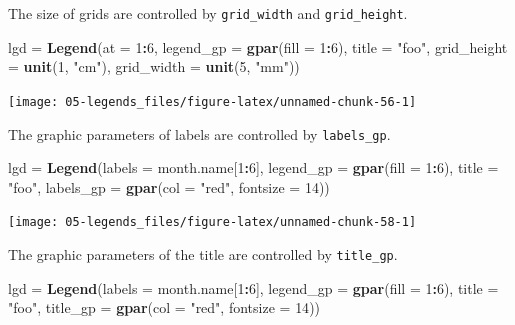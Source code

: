 \documentclass[]{book}
\newenvironment{Shaded}{\begin{snugshade}}{\end{snugshade}}
\newcommand{\KeywordTok}[1]{\textcolor[rgb]{0.13,0.29,0.53}{\textbf{#1}}}
\newcommand{\DataTypeTok}[1]{\textcolor[rgb]{0.13,0.29,0.53}{#1}}
\newcommand{\DecValTok}[1]{\textcolor[rgb]{0.00,0.00,0.81}{#1}}
\newcommand{\StringTok}[1]{\textcolor[rgb]{0.31,0.60,0.02}{#1}}
\newcommand{\OperatorTok}[1]{\textcolor[rgb]{0.81,0.36,0.00}{\textbf{#1}}}
\newcommand{\NormalTok}[1]{#1}
\theoremstyle{definition}
\theoremstyle{definition}
\theoremstyle{definition}
\theoremstyle{remark}
\begin{document}
The size of grids are controlled by \texttt{grid\_width} and
\texttt{grid\_height}.

\begin{Shaded}
\begin{Highlighting}[]
\NormalTok{lgd =}\StringTok{ }\KeywordTok{Legend}\NormalTok{(}\DataTypeTok{at =} \DecValTok{1}\OperatorTok{:}\DecValTok{6}\NormalTok{, }\DataTypeTok{legend_gp =} \KeywordTok{gpar}\NormalTok{(}\DataTypeTok{fill =} \DecValTok{1}\OperatorTok{:}\DecValTok{6}\NormalTok{), }\DataTypeTok{title =} \StringTok{"foo"}\NormalTok{, }
    \DataTypeTok{grid_height =} \KeywordTok{unit}\NormalTok{(}\DecValTok{1}\NormalTok{, }\StringTok{"cm"}\NormalTok{), }\DataTypeTok{grid_width =} \KeywordTok{unit}\NormalTok{(}\DecValTok{5}\NormalTok{, }\StringTok{"mm"}\NormalTok{))}
\end{Highlighting}
\end{Shaded}

\begin{center}\texttt{[image: 05-legends\_files/figure-latex/unnamed-chunk-56-1]} \end{center}

The graphic parameters of labels are controlled by \texttt{labels\_gp}.

\begin{Shaded}
\begin{Highlighting}[]
\NormalTok{lgd =}\StringTok{ }\KeywordTok{Legend}\NormalTok{(}\DataTypeTok{labels =}\NormalTok{ month.name[}\DecValTok{1}\OperatorTok{:}\DecValTok{6}\NormalTok{], }\DataTypeTok{legend_gp =} \KeywordTok{gpar}\NormalTok{(}\DataTypeTok{fill =} \DecValTok{1}\OperatorTok{:}\DecValTok{6}\NormalTok{), }\DataTypeTok{title =} \StringTok{"foo"}\NormalTok{, }
    \DataTypeTok{labels_gp =} \KeywordTok{gpar}\NormalTok{(}\DataTypeTok{col =} \StringTok{"red"}\NormalTok{, }\DataTypeTok{fontsize =} \DecValTok{14}\NormalTok{))}
\end{Highlighting}
\end{Shaded}

\begin{center}\texttt{[image: 05-legends\_files/figure-latex/unnamed-chunk-58-1]} \end{center}

The graphic parameters of the title are controlled by
\texttt{title\_gp}.

\begin{Shaded}
\begin{Highlighting}[]
\NormalTok{lgd =}\StringTok{ }\KeywordTok{Legend}\NormalTok{(}\DataTypeTok{labels =}\NormalTok{ month.name[}\DecValTok{1}\OperatorTok{:}\DecValTok{6}\NormalTok{], }\DataTypeTok{legend_gp =} \KeywordTok{gpar}\NormalTok{(}\DataTypeTok{fill =} \DecValTok{1}\OperatorTok{:}\DecValTok{6}\NormalTok{), }\DataTypeTok{title =} \StringTok{"foo"}\NormalTok{, }
    \DataTypeTok{title_gp =} \KeywordTok{gpar}\NormalTok{(}\DataTypeTok{col =} \StringTok{"red"}\NormalTok{, }\DataTypeTok{fontsize =} \DecValTok{14}\NormalTok{))}
\end{Highlighting}
\end{Shaded}
\end{document}
